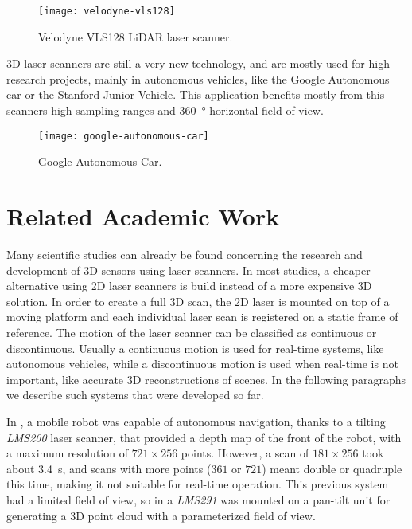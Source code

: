 \begin{figure}[h]
    \centering
    \texttt{[image: velodyne-vls128]}
    \caption{Velodyne VLS128 LiDAR laser scanner.}
    \label{fig:velodyne-vls128}
\end{figure}

3D laser scanners are still a very new technology, and are mostly used for high research projects, mainly in autonomous vehicles, like the Google Autonomous car \cite{google-self-driving} or the Stanford Junior Vehicle\cite{montemerlo08}. This application benefits mostly from this scanners high sampling ranges and \SI{360}{\degree} horizontal field of view.

\begin{figure}[h]
    \centering
    \texttt{[image: google-autonomous-car]}
    \caption{Google Autonomous Car.}
    \label{fig:google-autonomous-car}
\end{figure}

\section{Related Academic Work}

Many scientific studies can already be found concerning the research and development of 3D sensors using laser scanners. In most studies, a cheaper alternative using 2D laser scanners is build instead of a more expensive 3D solution. In order to create a full 3D scan, the 2D laser is mounted on top of a moving platform and each individual laser scan is registered on a static frame of reference. The motion of the laser scanner can be classified as continuous or discontinuous. Usually a continuous motion is used for real-time systems, like autonomous vehicles, while a discontinuous motion is used when real-time is not important, like accurate 3D reconstructions of scenes. In the following paragraphs we describe such systems that were developed so far.

In \cite{surmann2003}, a mobile robot was capable of autonomous navigation, thanks to a tilting \textit{LMS200} laser scanner, that provided a depth map of the front of the robot, with a maximum resolution of $721\times256$ points. However, a scan of $181\times256$ took about \SI{3.4}{\second}, and scans with more points ($361$ or $721$) meant double or quadruple this time, making it not suitable for real-time operation. This previous system had a limited field of view, so in \cite{zcai05} a \textit{LMS291} was mounted on a pan-tilt unit for generating a 3D point cloud with a parameterized field of view.

